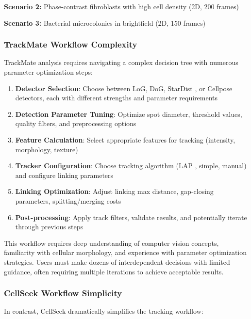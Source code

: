 \documentclass[../cellseek_paper.tex]{subfiles}
\begin{document}
\textbf{Scenario 2:} Phase-contrast fibroblasts with high cell density (2D, 200 frames)

\textbf{Scenario 3:} Bacterial microcolonies in brightfield (2D, 150 frames)

\subsubsection{TrackMate Workflow Complexity}

TrackMate analysis requires navigating a complex decision tree with numerous parameter optimization steps:

\begin{enumerate}
  \item \textbf{Detector Selection}: Choose between LoG, DoG, StarDist \cite{schmidt2018cell}, or Cellpose \cite{stringer2021cellpose} detectors, each with different strengths and parameter requirements
  \item \textbf{Detection Parameter Tuning}: Optimize spot diameter, threshold values, quality filters, and preprocessing options
  \item \textbf{Feature Calculation}: Select appropriate features for tracking (intensity, morphology, texture)
  \item \textbf{Tracker Configuration}: Choose tracking algorithm (LAP \cite{jaqaman2008robust}, simple, manual) and configure linking parameters
  \item \textbf{Linking Optimization}: Adjust linking max distance, gap-closing parameters, splitting/merging costs
  \item \textbf{Post-processing}: Apply track filters, validate results, and potentially iterate through previous steps
\end{enumerate}

This workflow requires deep understanding of computer vision concepts, familiarity with cellular morphology, and experience with parameter optimization strategies. Users must make dozens of interdependent decisions with limited guidance, often requiring multiple iterations to achieve acceptable results.

\subsubsection{CellSeek Workflow Simplicity}

In contrast, CellSeek dramatically simplifies the tracking workflow:
\end{document}
